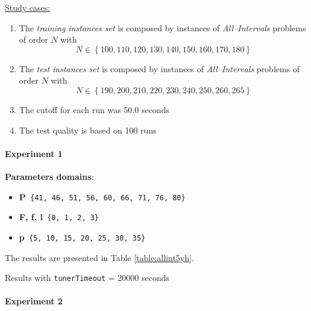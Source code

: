 \underline{Study cases:}
\begin{enumerate}
	\item The {\it training instances set} is composed by instances of {\it All--Intervals} problems of order $N$ with $$N \in \left\{100, 110, 120, 130, 140, 150, 160, 170, 180\right\}$$
	\item The {\it test instances set} is composed by instances of {\it All--Intervals} problems of order $N$ with $$N \in \left\{190, 200, 210, 220, 230, 240, 250, 260, 265\right\}$$
	\item The cutoff for each run was 50.0 seconds
	\item The test quality is based on 100 runs
\end{enumerate}

\paragraph{ Experiment 1}

{\bf Parameters domains}:

\begin{itemize}[itemsep=0.2mm]
	\item {\bf P}\texttt{ \{41, 46, 51, 56, 60, 66, 71, 76, 80\}}
	\item {\bf F, f, l}\texttt{ \{0, 1, 2, 3\}}
	\item {\bf p}\texttt{ \{5, 10, 15, 20, 25, 30, 35\}}
\end{itemize}

The results are presented in Table \ref{table:allint5yh}.

\begin{table}[H] 
	\caption{Results with \texttt{tunerTimeout} = 20000 seconds}
	\centering 
	\renewcommand{\arraystretch}{1.2}
	\label{table:allint5yh}
\end{table}

\paragraph{ Experiment 2}

